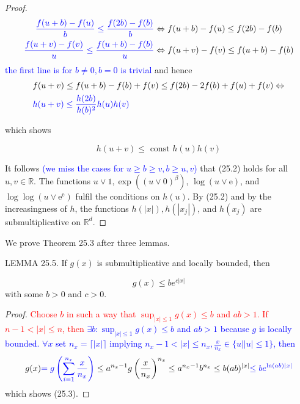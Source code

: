 \documentclass[a4paper,11pt]{article}
\begin{document}
\begin{proof}
    $$
        \begin{aligned}
            \textcolor{blue}{\frac{f(u+b)-f(u)}{b}  \leq \frac{f(2 b)-f(b)}{b}} & \Leftrightarrow f(u+b)-f(u)  \le f(2 b)-f(b) \\
            \textcolor{blue}{\frac{f(u+v)-f(v)}{u}  \leq \frac{f(u+b)-f(b)}{u}} & \Leftrightarrow f(u+v)-f(v)  \le f(u+b)-f(b)
        \end{aligned}
    $$
    \textcolor{blue}{ the first line is for $b \neq 0, b = 0$ is trivial }
    and hence
    \begin{align*}
         & f(u+v)                   \leq f(u+b)-f(b)+f(v) \leq f(2 b)-2 f(b)+f(u)+f(v) \Leftrightarrow \\
         & \textcolor{blue}{h(u+v)  \le \frac{h(2b)}{h(b)^{2}} h(u) h(v)}
    \end{align*}

    which shows

    \begin{equation*}
        h(u+v) \leq \text { const } h(u) h(v) \tag{25.2}
    \end{equation*}


    It follows \textcolor{blue}{(we miss the cases for $u \ge b \ge v, b \ge u,v $)} that (25.2) holds for all $u, v \in \mathbb{R}$. The functions
    $u \vee 1, \exp \left((u \vee 0)^{\beta}\right)$, $\log (u \vee \mathrm{e})$, and
    $\log \log \left(u \vee \mathrm{e}^{\mathrm{e}}\right)$ fulfil the conditions on
    $h(u)$. By (25.2) and by the increasingness of $h$, the functions $h(|x|), h\left(\left|x_{j}\right|\right)$, and
    $h\left(x_{j}\right)$ are submultiplicative on $\mathbb{R}^{d}$.

\end{proof}

We prove Theorem 25.3 after three lemmas.

LEMMA 25.5. If $g(x)$ is submultiplicative and locally bounded, then

\begin{equation*}
    g(x) \leq b e^{c|x|} \tag{25.3}
\end{equation*}
with some $b>0$ and $c>0$.

\begin{proof}
    \textcolor{red}{
        Choose $b$ in such a way that $\sup _{|x| \leq 1} g(x) \leq b$ and $a b>1$. If $n-1<|x| \leq n$,
        then
    }
    \textcolor{blue}{
        $\exists b: \sup _{|x| \leq 1} g(x) \leq b$ and $a b>1$ because $g$ is locally bounded.
        $\forall x$ set $n_x = \lceil \left| x \right| \rceil$ implying $n_x-1 < \left| x \right| \leq n_x, \frac{x}{n_x} \in \{u | |u| \leq 1\} $, then
    }
    $$
        g(x)
        \textcolor{blue}{
            = g\left(\sum_{i=1}^{n_x} \frac{x}{n_x}\right)
        }
        \leq a^{n_x-1} g\left(\frac{x}{n_x} \right)^{n_x} \leq a^{n_x-1} b^{n_x} \leq b(a b)^{|x|}
        \textcolor{blue}{
            \le b e^{\ln \left(ab\right)|x|}
        }
    $$
    which shows (25.3).
\end{proof}
\end{document}
